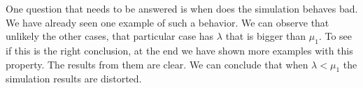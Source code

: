 \documentclass[12pt]{article}
\theoremstyle{plain}
\begin{document}
One question that needs to be answered is when does the simulation behaves bad.
We have already seen one example of such a behavior. We can observe that
unlikely the other cases, that particular case has $\lambda$ that is bigger than
$\mu_1$. To see if this is the right conclusion, at the end we have shown more
examples with this property. The results from them are clear. We can conclude
that when $\lambda < \mu_1$ the simulation results are distorted.
\end{document}
